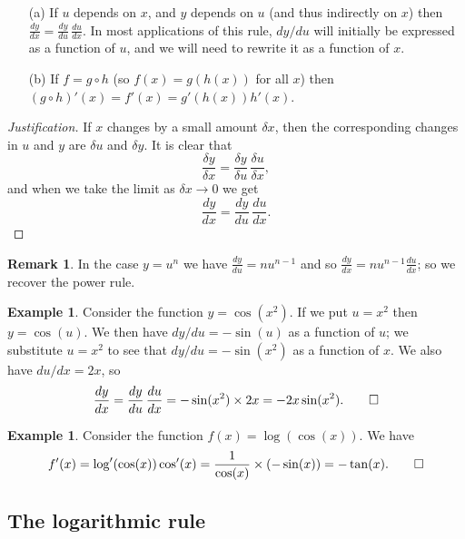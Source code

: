 \documentclass[a4paper]{book}
\newcommand{\tm}        {\times}
\newcommand{\dl}        {\delta}
\newcommand{\xra}       {\xrightarrow}
\renewcommand{\:}{\colon}
\theoremstyle{definition}
\newtheorem{remark}[theorem]{Remark}
\newtheorem{example}[theorem]{Example}
\begin{document}
\begin{itemize}
 \item[(a)] If $u$ depends on $x$, and $y$ depends on $u$ (and thus
  indirectly on $x$) then
  $\frac{dy}{dx}=\frac{dy}{du}\,\frac{du}{dx}$.  In most applications
  of this rule, $dy/du$ will initially be expressed as a function of
  $u$, and we will need to rewrite it as a function of $x$.
 \item[(b)] If $f=g\circ h$ (so $f(x)=g(h(x))$ for all $x$) then
  $(g\circ h)'(x)=f'(x)=g'(h(x))h'(x)$.
\end{itemize}
\begin{proof}[Justification]
 If $x$ changes by a small amount $\dl x$, then the corresponding
 changes in $u$ and $y$ are $\dl u$ and $\dl y$.  It is clear that 
 \[ \frac{\dl y}{\dl x} = \frac{\dl y}{\dl u}\, \frac{\dl u}{\dl x},
 \] 
 and when we take the limit as $\dl x\xra{}0$ we get
 \[ \frac{dy}{dx} = \frac{dy}{du} \, \frac{du}{dx}. \]
\end{proof}
\begin{remark}
 In the case $y=u^n$ we have $\frac{dy}{du}=nu^{n-1}$ and so
 $\frac{dy}{dx}=nu^{n-1}\frac{du}{dx}$; so we recover the power rule.
\end{remark}
\begin{example}
 Consider the function $y=\cos(x^2)$.  If we put $u=x^2$ then
 $y=\cos(u)$.  We then have $dy/du=-\sin(u)$ as a function of $u$; we
 substitute $u=x^2$ to see that $dy/du=-\sin(x^2)$ as a function of
 $x$.  We also have $du/dx=2x$, so
 \[ \frac{dy}{dx} = \frac{dy}{du}\,\frac{du}{dx} =
      -\sin(x^2) \tm 2x = -2x\sin(x^2). \qed
 \]
\end{example}
\begin{example}
 Consider the function $f(x)=\log(\cos(x))$.  We have
 \[ f'(x) = \log'(\cos(x))\cos'(x) = \frac{1}{\cos(x)} \tm (-\sin(x))
          = -\tan(x). \qed
 \]  
\end{example}

\subsection{The logarithmic rule}
\label{subsec-rule-log}
\end{document}
